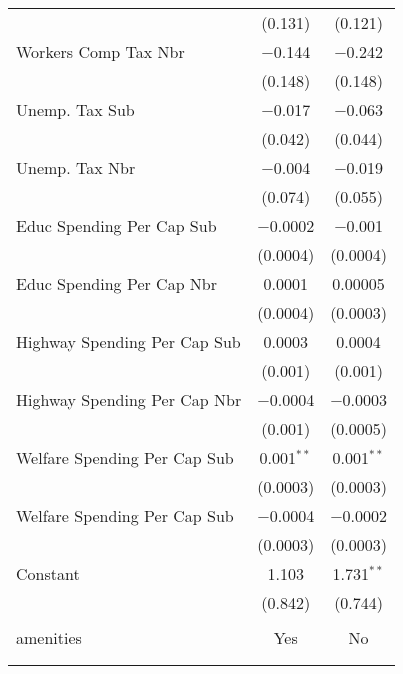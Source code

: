 \begin{table}[!htbp]
\begin{tabular}{@{\extracolsep{5pt}}lcc}
  & (0.131) & (0.121) \\ 
  Workers Comp Tax Nbr & $-$0.144 & $-$0.242 \\ 
  & (0.148) & (0.148) \\ 
  Unemp. Tax Sub & $-$0.017 & $-$0.063 \\ 
  & (0.042) & (0.044) \\ 
  Unemp. Tax Nbr & $-$0.004 & $-$0.019 \\ 
  & (0.074) & (0.055) \\ 
  Educ Spending Per Cap Sub & $-$0.0002 & $-$0.001 \\ 
  & (0.0004) & (0.0004) \\ 
  Educ Spending Per Cap Nbr & 0.0001 & 0.00005 \\ 
  & (0.0004) & (0.0003) \\ 
  Highway Spending Per Cap Sub & 0.0003 & 0.0004 \\ 
  & (0.001) & (0.001) \\ 
  Highway Spending Per Cap Nbr & $-$0.0004 & $-$0.0003 \\ 
  & (0.001) & (0.0005) \\ 
  Welfare Spending Per Cap Sub & 0.001$^{**}$ & 0.001$^{**}$ \\ 
  & (0.0003) & (0.0003) \\ 
  Welfare Spending Per Cap Sub & $-$0.0004 & $-$0.0002 \\ 
  & (0.0003) & (0.0003) \\ 
  Constant & 1.103 & 1.731$^{**}$ \\ 
  & (0.842) & (0.744) \\ 
 \hline \\[-1.8ex] 
amenities & Yes & No \\ 
\hline \\[-1.8ex] 
\hline 
\hline \\[-1.8ex] 
\end{tabular} 
\end{table} 
